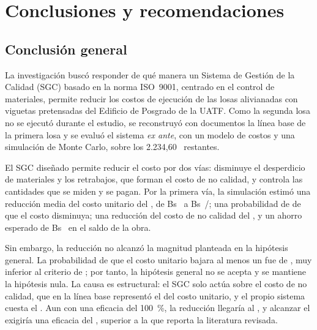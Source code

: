 \chapter*{Conclusiones y recomendaciones}
\setcounter{section}{0}
\renewcommand{\thesection}{\arabic{section}}

\section{Conclusión general}

La investigación buscó responder de qué manera un Sistema de Gestión de la Calidad (SGC) basado en la norma ISO~9001, centrado en el control de materiales, permite reducir los costos de ejecución de las losas alivianadas con viguetas pretensadas del Edificio de Posgrado de la UATF. Como la segunda losa no se ejecutó durante el estudio, se reconstruyó con documentos la línea base de la primera losa y se evaluó el sistema \emph{ex ante}, con un modelo de costos y una simulación de Monte Carlo, sobre los 2.234,60~\mdos{} restantes.

El SGC diseñado permite reducir el costo por dos vías: disminuye el desperdicio de materiales y los retrabajos, que forman el costo de no calidad, y controla las cantidades que se miden y se pagan. Por la primera vía, la simulación estimó una reducción media del costo unitario del \rMedia{}, de Bs~\CUsinMedia{} a Bs~\CUconMedia/\mdos{}; una probabilidad de \PRpos{} de que el costo disminuya; una reducción del costo de no calidad del \CNCreduccionPct{}, y un ahorro esperado de Bs~\AhorroMedia{} en el saldo de la obra.

Sin embargo, la reducción no alcanzó la magnitud planteada en la hipótesis general. La probabilidad de que el costo unitario bajara al menos un \MCumbral{} fue de \PHG{}, muy inferior al criterio de \MCconf{}; por tanto, la hipótesis general no se acepta y se mantiene la hipótesis nula. La causa es estructural: el SGC solo actúa sobre el costo de no calidad, que en la línea base representó el \CNCsinDetPct{} del costo unitario, y el propio sistema cuesta el \CCconDetPct{}. Aun con una eficacia del 100~\%, la reducción llegaría al \rMaxTeorico{}, y alcanzar el \MCumbral{} exigiría una eficacia del \KequilibrioUmbral{}, superior a la que reporta la literatura revisada.

